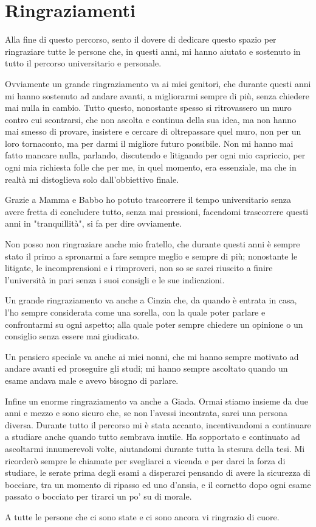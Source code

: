 
\chapter*{Ringraziamenti}

Alla fine di questo percorso, sento il dovere di dedicare questo spazio per ringraziare tutte le persone che, in questi anni, mi hanno aiutato e sostenuto in tutto il percorso universitario e personale.



Ovviamente un grande ringraziamento va ai miei genitori, che durante questi anni mi hanno sostenuto ad andare avanti, a migliorarmi sempre di più, senza chiedere mai nulla in cambio.
Tutto questo, nonostante spesso si ritrovassero un muro contro cui scontrarsi, che non ascolta e continua della sua idea, ma non hanno mai smesso di provare, insistere e cercare di oltrepassare quel muro, non per un loro tornaconto, ma per darmi il migliore futuro possibile.
Non mi hanno mai fatto mancare nulla, parlando, discutendo e litigando per ogni mio capriccio, per ogni mia richiesta folle che per me, in quel momento, era essenziale, ma che in realtà mi distoglieva solo dall'obbiettivo finale.

Grazie a Mamma e Babbo ho potuto trascorrere il tempo universitario senza avere fretta di concludere tutto, senza mai pressioni, facendomi trascorrere questi anni in "tranquillità", si fa per dire ovviamente.

Non posso non ringraziare anche mio fratello, che durante questi anni è sempre stato il primo a spronarmi a fare sempre meglio e sempre di più; nonostante le litigate, le incomprensioni e i rimproveri, non so se sarei riuscito a finire l'università in pari senza i suoi consigli e le sue indicazioni.

Un grande ringraziamento va anche a Cinzia che, da quando è entrata in casa, l'ho sempre considerata come una sorella, con la quale poter parlare e confrontarmi su ogni aspetto; alla quale poter sempre chiedere un opinione o un consiglio senza essere mai giudicato.

Un pensiero speciale va anche ai miei nonni, che mi hanno sempre motivato ad andare avanti ed proseguire gli studi; mi hanno sempre ascoltato quando un esame andava male e avevo bisogno di parlare.

Infine un enorme ringraziamento va anche a Giada. Ormai stiamo insieme da due anni e mezzo e sono sicuro che, se non l'avessi incontrata, sarei una persona diversa.
Durante tutto il percorso mi è stata accanto, incentivandomi a continuare a studiare anche quando tutto sembrava inutile. Ha sopportato e continuato ad ascoltarmi innumerevoli volte, aiutandomi durante tutta la stesura della tesi.
Mi ricorderò sempre le chiamate per svegliarci a vicenda e per darci la forza di studiare, le serate prima degli esami a disperarci pensando di avere la sicurezza di bocciare, tra un momento di ripasso ed uno d'ansia, e il cornetto dopo ogni esame passato o bocciato per tirarci un po' su di morale.

A tutte le persone che ci sono state e ci sono ancora vi ringrazio di cuore.